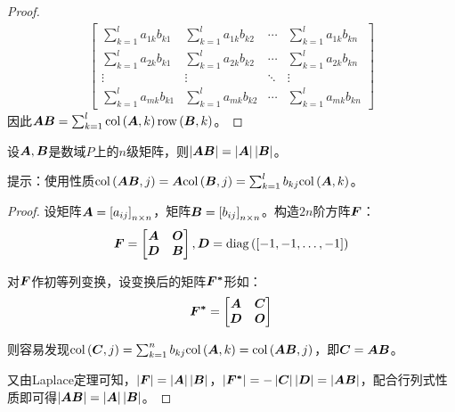 \begin{proof}
\begin{align*}
\begin{bmatrix}
            \sum_{k=1}^la_{1k}b_{k1} & \sum_{k=1}^la_{1k}b_{k2} & \cdots & \sum_{k=1}^la_{1k}b_{kn} \\
            \sum_{k=1}^la_{2k}b_{k1} & \sum_{k=1}^la_{2k}b_{k2} & \cdots & \sum_{k=1}^la_{2k}b_{kn} \\
            \vdots                   & \vdots                   & \ddots & \vdots                   \\
            \sum_{k=1}^la_{mk}b_{k1} & \sum_{k=1}^la_{mk}b_{k2} & \cdots & \sum_{k=1}^la_{mk}b_{kn}
        \end{bmatrix}
    \end{align*}
    因此\(\boldsymbol{A}\boldsymbol{B}=\sum_{k=1}^l\mathrm{col}\left( \boldsymbol{A},k \right)\mathrm{row}\left( \boldsymbol{B},k \right)\)。
\end{proof}

\begin{extraprob}\label{extra-1.3}
    设\(\boldsymbol{A},\boldsymbol{B}\)是数域\(P\)上的\(n\)级矩阵，则\(\left|\boldsymbol{A}\boldsymbol{B} \right|=\left|\boldsymbol{A} \right|\left|\boldsymbol{B} \right|\)。

    提示：使用性质\(\mathrm{col}\left( \boldsymbol{A}\boldsymbol{B},j \right)=\boldsymbol{A}\mathrm{col}\left( \boldsymbol{B},j \right)=\sum_{k=1}^lb_{kj}\mathrm{col}\left( \boldsymbol{A},k \right)\)。
\end{extraprob}
\begin{proof}
    设矩阵\(\boldsymbol{A}=\left[ a_{ij} \right]_{n\times n}\)，矩阵\(\boldsymbol{B}=\left[ b_{ij} \right]_{n\times n}\)。构造\(2n\)阶方阵\(\boldsymbol{F}\)：
    \begin{equation*}
        \boldsymbol{F}=
        \begin{bmatrix}
            \boldsymbol{A} & \boldsymbol{O} \\\boldsymbol{D}&\boldsymbol{B}
        \end{bmatrix},\boldsymbol{D}=\mathrm{diag}\left( \left[ -1,-1,\dots,-1 \right] \right)
    \end{equation*}

    对\(\boldsymbol{F}\)作初等列变换，设变换后的矩阵\(\boldsymbol{F^*}\)形如：
    \begin{equation*}
        \boldsymbol{F^*}=\begin{bmatrix}\boldsymbol{A}&\boldsymbol{C}\\\boldsymbol{D}&\boldsymbol{O}\end{bmatrix}
    \end{equation*}

    则容易发现\(\mathrm{col}\left( \boldsymbol{C},j \right)=\sum_{k=1}^nb_{kj}\mathrm{col}\left( \boldsymbol{A},k \right)=\mathrm{col}\left( \boldsymbol{A}\boldsymbol{B},j \right)\)，即\(\boldsymbol{C}=\boldsymbol{A}\boldsymbol{B}\)。

    又由Laplace定理可知，\(\left|\boldsymbol{F} \right|=\left|\boldsymbol{A} \right|\left|\boldsymbol{B} \right|\)，\(\left|\boldsymbol{F^*} \right|=-\left|\boldsymbol{C} \right|\left|\boldsymbol{D} \right|=\left|\boldsymbol{A}\boldsymbol{B} \right|\)，配合行列式性质即可得\(\left|\boldsymbol{A}\boldsymbol{B} \right|=\left|\boldsymbol{A} \right|\left|\boldsymbol{B} \right|\)。

\end{proof}


